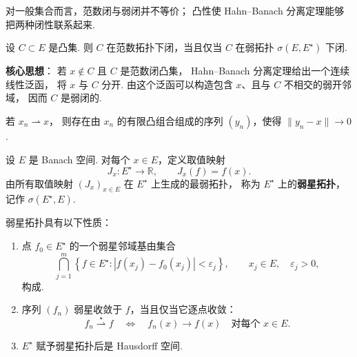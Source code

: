 
对一般集合而言，范数闭与弱闭并不等价；
凸性使 Hahn--Banach 分离定理能够把两种闭性联系起来.

\begin{theorem}[闭凸集的强闭与弱闭]
    设 $C\subset E$ 是凸集.
    则 $C$ 在范数拓扑下闭，当且仅当
    $C$ 在弱拓扑 $\sigma(E,E^\star)$ 下闭.
\end{theorem}

\begin{remarkbox}
    \textbf{核心思想}：
    若 $x\notin C$ 且 $C$ 是范数闭凸集，
    Hahn--Banach 分离定理给出一个连续线性泛函，
    将 $x$ 与 $C$ 分开.
    由这个泛函可以构造包含 $x$、且与 $C$ 不相交的弱开邻域，
    因而 $C$ 是弱闭的.
\end{remarkbox}

\begin{corollary}[Mazur 推论]
    若 $x_n\rightharpoonup x$，
    则存在由 $x_n$ 的有限凸组合组成的序列 $(y_n)$，使得
    $\|y_n-x\|\to0$.
\end{corollary}


\begin{definition}[弱星拓扑]
    设 $E$ 是 Banach 空间.
    对每个 $x\in E$，定义取值映射
    \[
        J_x:E^\star\to\mathbb{R},
        \qquad J_x(f)=f(x).
    \]
    由所有取值映射 $(J_x)_{x\in E}$ 在 $E^\star$ 上生成的最弱拓扑，
    称为 $E^\star$ 上的\textbf{弱星拓扑}，记作
    $\sigma(E^\star,E)$.
\end{definition}

\begin{proposition}[弱星邻域与弱星收敛]
    弱星拓扑具有以下性质：
    \begin{enumerate}
        \item 点 $f_0\in E^\star$ 的一个弱星邻域基由集合
        \[
            \bigcap_{j=1}^{m}
            \left\{f\in E^\star:
            |f(x_j)-f_0(x_j)|<\varepsilon_j\right\},
            \qquad x_j\in E,\quad\varepsilon_j>0,
        \]
        构成.
        \item 序列 $(f_n)$ 弱星收敛于 $f$，当且仅当它逐点收敛：
        \[
            f_n\overset{\star}{\rightharpoonup}f
            \quad\Longleftrightarrow\quad
            f_n(x)\to f(x)
            \quad\text{对每个 }x\in E.
        \]
        \item $E^\star$ 赋予弱星拓扑后是 Hausdorff 空间.
    \end{enumerate}
\end{proposition}

